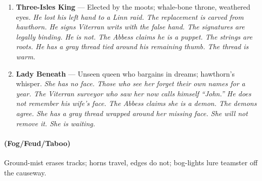 \begin{enumerate}
\item[K] \textbf{Three-Isles King} --- Elected by the moots; whale-bone throne, weathered eyes.
  \hfill \textit{He lost his left hand to a Linn raid. The replacement is carved from hawthorn. He signs Viterran writs with the false hand. The signatures are legally binding. He is not. The Abbess claims he is a puppet. The strings are roots. He has a gray thread tied around his remaining thumb. The thread is warm.}
\item[A] \textbf{Lady Beneath} --- Unseen queen who bargains in dreams; hawthorn's whisper.
  \hfill \textit{She has no face. Those who see her forget their own names for a year. The Viterran surveyor who saw her now calls himself ``John.'' He does not remember his wife's face. The Abbess claims she is a demon. The demons agree. She has a gray thread wrapped around her missing face. She will not remove it. She is waiting.}
\end{enumerate}

\paragraph*{(Fog/Feud/Taboo)} Ground-mist erases tracks; horns travel, edges do not; bog-lights lure teamster off the causeway.

